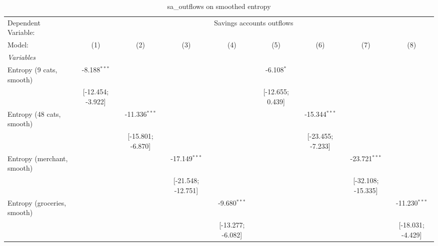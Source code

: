 
\begin{table}[htbp]
   \centering
   \tiny
   \begin{threeparttable}[b]
      \caption{\label{tab:reg_sa_outflows_s} sa\_outflows on smoothed entropy}
      \begin{tabular}{lcccccccc}
         \tabularnewline \midrule \midrule
         Dependent Variable: & \multicolumn{8}{c}{Savings accounts outflows}\\
         Model:                      & (1)                & (2)                & (3)                & (4)                & (5)                 & (6)                 & (7)                 & (8)\\  
         \midrule
         \emph{Variables}\\
         Entropy (9 cats, smooth)    & -8.188$^{***}$     &                    &                    &                    & -6.108$^{*}$        &                     &                     &   \\   
                                     & [-12.454; -3.922]  &                    &                    &                    & [-12.655; 0.439]    &                     &                     &   \\   
         Entropy (48 cats, smooth)   &                    & -11.336$^{***}$    &                    &                    &                     & -15.344$^{***}$     &                     &   \\   
                                     &                    & [-15.801; -6.870]  &                    &                    &                     & [-23.455; -7.233]   &                     &   \\   
         Entropy (merchant, smooth)  &                    &                    & -17.149$^{***}$    &                    &                     &                     & -23.721$^{***}$     &   \\   
                                     &                    &                    & [-21.548; -12.751] &                    &                     &                     & [-32.108; -15.335]  &   \\   
         Entropy (groceries, smooth) &                    &                    &                    & -9.680$^{***}$     &                     &                     &                     & -11.230$^{***}$\\   
                                     &                    &                    &                    & [-13.277; -6.082]  &                     &                     &                     & [-18.031; -4.429]\\   

\end{tabular}
\end{threeparttable}
\end{table}
